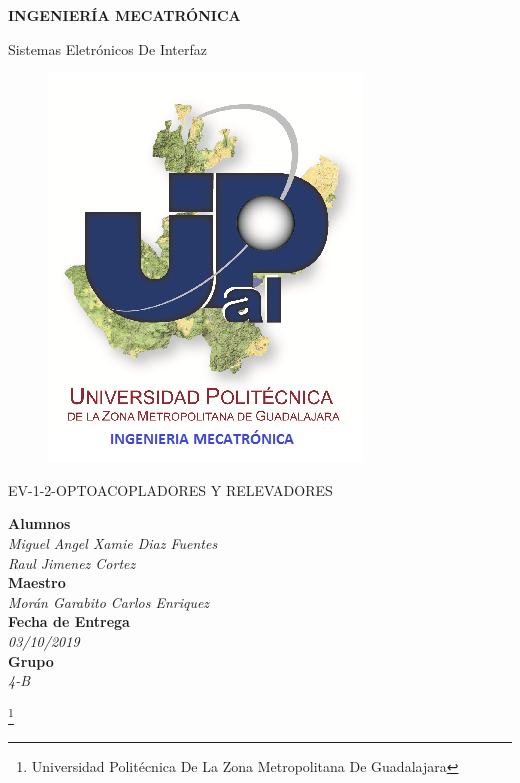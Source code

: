 \documentclass[10pt,a4paper]{article}
\author{Miguel Angel Xamie Diaz Fuentes/Jimenez Cortes Raul}
\begin{document}
\begin{center}
\begin{LARGE}
\textbf{INGENIERÍA MECATRÓNICA}\\
\end{LARGE}
{\large Sistemas Eletrónicos De Interfaz}\\
\begin{figure}[hbtp]
\centering
\includegraphics[scale=0.80]{UPZMG_Mecatr_nica.png}
\end{figure} 
\begin{center}
\begin{LARGE}
EV-1-2-OPTOACOPLADORES Y RELEVADORES
\end{LARGE}
\end{center}

\begin{Large}
\textbf{Alumnos}
\\\textit{Miguel Angel Xamie Diaz Fuentes\\Raul Jimenez Cortez}
\textbf{\\Maestro}
\\\textit{Morán Garabito Carlos Enriquez}
\textbf{\\Fecha de Entrega}
\\\textit{03/10/2019}
\textbf{\\Grupo}
\\\textit{4-B}
\end{Large}

\end{center}

\footnote{Universidad Politécnica De La Zona Metropolitana De Guadalajara} 
\end{document}
